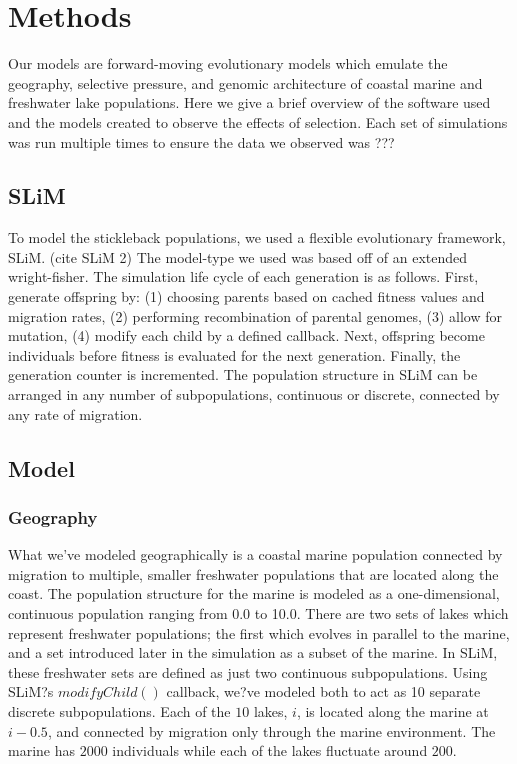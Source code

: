 \documentclass{article}
\begin{document}
\section{Methods}

Our models are forward-moving evolutionary models which
emulate the geography, selective pressure, and genomic architecture 
of coastal marine and freshwater lake populations. 
Here we give a brief overview of the software used and the models created to observe the effects of selection. 
Each set of simulations was run multiple times to ensure the data we observed was ???


\subsection{SLiM}

To model the stickleback populations, we used a flexible evolutionary framework, SLiM. (cite SLiM 2) 
The model-type we used was based off of an extended wright-fisher. 
The simulation life cycle of each generation is as follows.
First, 
generate offspring by:
(1) choosing parents based on cached fitness values and migration rates, 
(2) performing recombination of parental genomes, 
(3) allow for mutation, 
(4) modify each child by a defined callback. 
Next, 
offspring become individuals before fitness is evaluated for the next generation.
Finally,
the generation counter is incremented. 
The population structure in SLiM can be arranged in any number of subpopulations, 
continuous or discrete, connected by any rate of migration. 


\subsection{Model}

\subsubsection{Geography}

What we've modeled geographically is a coastal marine population 
connected by migration to multiple, smaller freshwater populations that are located along the coast.
The population structure for the marine is modeled as a one-dimensional, continuous population
ranging from 0.0 to 10.0.
There are two sets of lakes which represent freshwater populations; 
the first which evolves in parallel to the marine, 
and a set introduced later in the simulation as a subset of the marine. 
In SLiM, these freshwater sets are defined as just two continuous subpopulations. 
Using SLiM?s $modifyChild()$ callback, we?ve modeled both to act as 10 separate discrete subpopulations. 
Each of the $10$ lakes, $i$, is located along the marine at $i - 0.5$, 
and connected by migration only through the marine environment. 
The marine has $2000$ individuals while 
each of the lakes fluctuate around $200$. 
\end{document}
